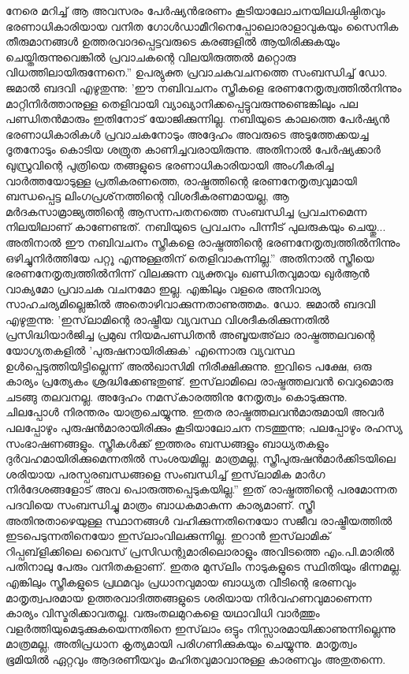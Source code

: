 നേരെ മറിച്ച് ആ അവസരം പേര്‍ഷ്യന്‍ഭരണം കൂടിയാലോചനയിലധിഷ്ഠിതവും ഭരണാധികാരിയായ വനിത ഗോള്‍ഡാമീറിനെപ്പോലൊരാളാവുകയും സൈനിക തീരുമാനങ്ങള്‍ ഉത്തരവാദപ്പെട്ടവരുടെ കരങ്ങളില്‍ ആയിരിക്കുകയും ചെയ്തിരുന്നുവെങ്കില്‍ പ്രവാചകന്റെ വിലയിരുത്തല്‍ മറ്റൊരു വിധത്തിലായിരുന്നേനെ.''
ഉപര്യുക്ത പ്രവാചകവചനത്തെ സംബന്ധിച്ച് ഡോ. ജമാല്‍ ബദവി എഴുതുന്നു: 'ഈ നബിവചനം സ്ത്രീകളെ ഭരണനേതൃത്വത്തില്‍നിന്നും മാറ്റിനിര്‍ത്താനുള്ള തെളിവായി വ്യാഖ്യാനിക്കപ്പെട്ടുവരുന്നുണ്ടെങ്കിലും പല പണ്ഡിതന്‍മാരും ഇതിനോട് യോജിക്കുന്നില്ല. നബിയുടെ കാലത്തെ പേര്‍ഷ്യന്‍ ഭരണാധികാരികള്‍ പ്രവാചകനോടും അദ്ദേഹം അവരുടെ അടുത്തേക്കയച്ച ദൂതനോടും കൊടിയ ശത്രുത കാണിച്ചവരായിരുന്നു. അതിനാല്‍ പേര്‍ഷ്യക്കാര്‍ ഖുസ്രുവിന്റെ പുത്രിയെ തങ്ങളുടെ ഭരണാധികാരിയായി അംഗീകരിച്ച വാര്‍ത്തയോടുള്ള പ്രതികരണത്തെ, രാഷ്ട്രത്തിന്റെ ഭരണനേതൃത്വവുമായി ബന്ധപ്പെട്ട ലിംഗപ്രശ്‌നത്തിന്റെ വിശദീകരണമായല്ല, ആ മര്‍ദകസാമ്രാജ്യത്തിന്റെ ആസന്നപതനത്തെ സംബന്ധിച്ച പ്രവചനമെന്ന നിലയിലാണ് കാണേണ്ടത്. നബിയുടെ പ്രവചനം പിന്നീട് പുലരുകയും ചെയ്തു... അതിനാല്‍ ഈ നബിവചനം സ്ത്രീകളെ രാഷ്ട്രത്തിന്റെ ഭരണനേതൃത്വത്തില്‍നിന്നും ഒഴിച്ചുനിര്‍ത്തിയേ പറ്റൂ എന്നുള്ളതിന് തെളിവാകുന്നില്ല.''
അതിനാല്‍ സ്ത്രീയെ ഭരണനേതൃത്വത്തില്‍നിന്ന് വിലക്കുന്ന വ്യക്തവും ഖണ്ഡിതവുമായ ഖുര്‍ആന്‍ വാക്യമോ പ്രവാചക വചനമോ ഇല്ല. എങ്കിലും വളരെ അനിവാര്യ സാഹചര്യമില്ലെങ്കില്‍ അതൊഴിവാക്കുന്നതാണുത്തമം. ഡോ. ജമാല്‍ ബദവി എഴുതുന്നു: 'ഇസ്‌ലാമിന്റെ രാഷ്ട്രീയ വ്യവസ്ഥ വിശദീകരിക്കുന്നതില്‍ പ്രസിദ്ധിയാര്‍ജിച്ച പ്രമുഖ നിയമപണ്ഡിതന്‍ അബൂയഅ്‌ലാ രാഷ്ട്രത്തലവന്റെ യോഗ്യതകളില്‍ 'പുരുഷനായിരിക്കുക' എന്നൊരു വ്യവസ്ഥ ഉള്‍പ്പെടുത്തിയിട്ടില്ലെന്ന് അല്‍ഖാസിമി നിരീക്ഷിക്കുന്നു. ഇവിടെ പക്ഷേ, ഒരു കാര്യം പ്രത്യേകം ശ്രദ്ധിക്കേണ്ടതുണ്ട്. ഇസ്‌ലാമിലെ രാഷ്ട്രത്തലവന്‍ വെറുമൊരു ചടങ്ങു തലവനല്ല. അദ്ദേഹം നമസ്‌കാരത്തിനു നേതൃത്വം കൊടുക്കുന്നു. ചിലപ്പോള്‍ നിരന്തരം യാത്രചെയ്യുന്നു. ഇതര രാഷ്ട്രത്തലവന്‍മാരുമായി അവര്‍ പലപ്പോഴും പുരുഷന്‍മാരായിരിക്കും കൂടിയാലോചന നടത്തുന്നു; പലപ്പോഴും രഹസ്യ സംഭാഷണങ്ങളും. സ്ത്രീകള്‍ക്ക് ഇത്തരം ബന്ധങ്ങളും ബാധ്യതകളും ദുര്‍വഹമായിരിക്കുമെന്നതില്‍ സംശയമില്ല. മാത്രമല്ല, സ്ത്രീപുരുഷന്‍മാര്‍ക്കിടയിലെ ശരിയായ പരസ്പരബന്ധങ്ങളെ സംബന്ധിച്ച് ഇസ്‌ലാമിക മാര്‍ഗ നിര്‍ദേശങ്ങളോട് അവ പൊരുത്തപ്പെടുകയില്ല.''
ഇത് രാഷ്ട്രത്തിന്റെ പരമോന്നത പദവിയെ സംബന്ധിച്ചു മാത്രം ബാധകമാകുന്ന കാര്യമാണ്. സ്ത്രീ അതിനുതാഴെയുള്ള സ്ഥാനങ്ങള്‍ വഹിക്കുന്നതിനെയോ സജീവ രാഷ്ട്രീയത്തില്‍ ഇടപെടുന്നതിനെയോ ഇസ്‌ലാംവിലക്കുന്നില്ല. ഇറാന്‍ ഇസ്‌ലാമിക് റിപ്പബ്‌ളിക്കിലെ വൈസ് പ്രസിഡന്റുമാരിലൊരാളും അവിടത്തെ എം.പി.മാരില്‍ പതിനാലു പേരും വനിതകളാണ്. ഇതര മുസ്‌ലിം നാടുകളുടെ സ്ഥിതിയും ഭിന്നമല്ല.
എങ്കിലും സ്ത്രീകളുടെ പ്രഥമവും പ്രധാനവുമായ ബാധ്യത വീടിന്റെ ഭരണവും മാതൃത്വപരമായ ഉത്തരവാദിത്തങ്ങളുടെ ശരിയായ നിര്‍വഹണവുമാണെന്ന കാര്യം വിസ്മരിക്കാവതല്ല. വരുംതലമുറകളെ യഥാവിധി വാര്‍ത്തും വളര്‍ത്തിയുമെടുക്കുകയെന്നതിനെ ഇസ്‌ലാം ഒട്ടും നിസ്സാരമായിക്കാണുന്നില്ലെന്നു മാത്രമല്ല, അതിപ്രധാന കൃത്യമായി പരിഗണിക്കുകയും ചെയ്യുന്നു. മാതൃത്വം ഭൂമിയില്‍ ഏറ്റവും ആദരണീയവും മഹിതവുമാവാനുള്ള കാരണവും അതുതന്നെ.
